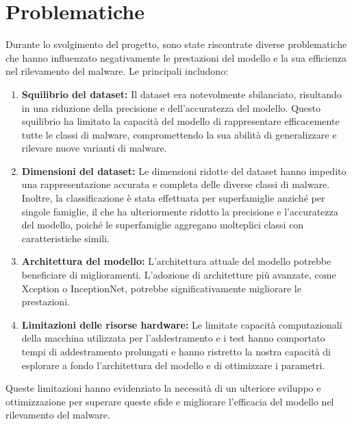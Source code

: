 \section{Problematiche}
\label{Problema}
Durante lo svolgimento del progetto, sono state riscontrate diverse problematiche che hanno influenzato negativamente le prestazioni del modello e la sua efficienza nel rilevamento del malware. Le principali includono:
\begin{enumerate}
  \item \textbf{Squilibrio del dataset:} Il dataset era notevolmente sbilanciato, risultando in una riduzione della precisione e dell'accuratezza del modello. Questo squilibrio ha limitato la capacità del modello di rappresentare efficacemente tutte le classi di malware, compromettendo la sua abilità di generalizzare e rilevare nuove varianti di malware.
  \item \textbf{Dimensioni del dataset:} Le dimensioni ridotte del dataset hanno impedito una rappresentazione accurata e completa delle diverse classi di malware. Inoltre, la classificazione è stata effettuata per superfamiglie anziché per singole famiglie, il che ha ulteriormente ridotto la precisione e l'accuratezza del modello, poiché le superfamiglie aggregano molteplici classi con caratteristiche simili.
  \item \textbf{Architettura del modello:} L'architettura attuale del modello potrebbe beneficiare di miglioramenti. L'adozione di architetture più avanzate, come Xception o InceptionNet, potrebbe significativamente migliorare le prestazioni.
  \item \textbf{Limitazioni delle risorse hardware:} Le limitate capacità computazionali della macchina utilizzata per l'addestramento e i test hanno comportato tempi di addestramento prolungati e hanno ristretto la nostra capacità di esplorare a fondo l'architettura del modello e di ottimizzare i parametri.
\end{enumerate}
Queste limitazioni hanno evidenziato la necessità di un ulteriore sviluppo e ottimizzazione per superare queste sfide e migliorare l'efficacia del modello nel rilevamento del malware.


